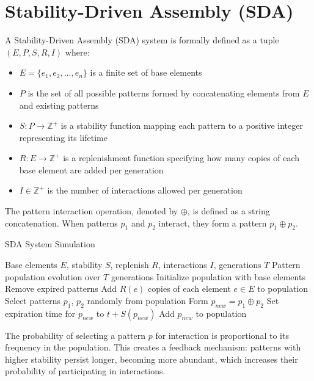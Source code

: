 \documentclass[life,article,submit,pdftex,moreauthors]{Definitions/mdpi}
\begin{document}
\section{Stability-Driven Assembly (SDA)}

A Stability-Driven Assembly (SDA) \cite{adler_sda} system is formally defined as a tuple $(E, P, S, R, I)$ where:
\begin{itemize}
   \item $E = \{e_1, e_2, \ldots, e_n\}$ is a finite set of base elements
   \item $P$ is the set of all possible patterns formed by concatenating elements from $E$ and existing patterns
   \item $S: P \rightarrow \mathbb{Z}^{+}$ is a stability function mapping each pattern to a positive integer representing its lifetime
   \item $R: E \rightarrow \mathbb{Z}^{+}$ is a replenishment function specifying how many copies of each base element are added per generation
   \item $I \in \mathbb{Z}^{+}$ is the number of interactions allowed per generation
\end{itemize}

The pattern interaction operation, denoted by $\oplus$, is defined as a string concatenation. When patterns $p_1$ and $p_2$ interact, they form a pattern $p_1 \oplus p_2$.

\begin{algorithm}[H]
\caption{SDA System Simulation}
\begin{algorithmic}[1]
\REQUIRE Base elements $E$, stability $S$, replenish $R$, interactions $I$, generations $T$
\ENSURE Pattern population evolution over $T$ generations
\STATE Initialize population with base elements
   \STATE Remove expired patterns
   \STATE Add $R(e)$ copies of each element $e \in E$ to population
       \STATE Select patterns $p_1$, $p_2$ randomly from population
       \STATE Form $p_{new} = p_1 \oplus p_2$
       \STATE Set expiration time for $p_{new}$ to $t + S(p_{new})$
       \STATE Add $p_{new}$ to population
   \ENDFOR
\ENDFOR
\end{algorithmic}
\end{algorithm}


The probability of selecting a pattern $p$ for interaction is proportional to its frequency in the population. This creates a feedback mechanism: patterns with higher stability persist longer, becoming more abundant, which increases their probability of participating in interactions.
\end{document}
